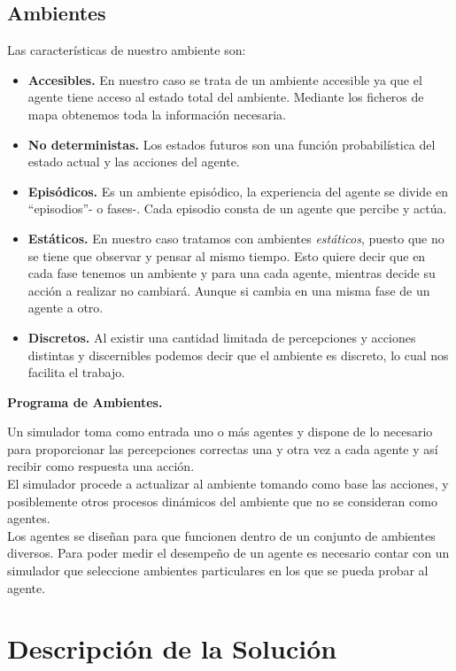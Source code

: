 \documentclass[a4paper,12pt,oneside]{book}
\begin{document}
\section{Ambientes}
Las características de nuestro ambiente son:
\begin{itemize}
\item {\bf Accesibles.} En nuestro caso se trata de un
  ambiente accesible ya que el agente tiene acceso al estado total
  del ambiente. Mediante los ficheros de mapa obtenemos toda la
  información necesaria.
\item {\bf No deterministas.}                                                 
Los estados futuros son una función probabilística del estado actual y
las acciones del agente.
\item {\bf Episódicos.} Es un ambiente episódico, la experiencia del
  agente se divide en ``episodios''- o fases-. Cada episodio consta de
  un agente que percibe y actúa.
\item {\bf Estáticos.}   En nuestro caso tratamos con ambientes {\it
    estáticos}, puesto que no se tiene que observar y pensar al mismo
  tiempo. Esto quiere decir que en cada fase tenemos un ambiente y
  para una cada agente, mientras decide su acción a realizar no
  cambiará. Aunque si cambia en una misma fase de un agente a otro.
\item {\bf Discretos.} Al existir una cantidad limitada de
  percepciones y acciones distintas y discernibles podemos decir que el
  ambiente es discreto, lo cual nos facilita el trabajo.
\end{itemize}

{\bf Programa de Ambientes.}

Un simulador toma como entrada uno o más agentes y dispone de lo
necesario para proporcionar las percepciones correctas una y otra vez
a cada agente y así recibir como respuesta una acción.\\

El simulador procede a actualizar  al ambiente tomando como base las
acciones, y posiblemente otros procesos dinámicos del ambiente que no
se consideran como agentes.\\

Los agentes se diseñan para que funcionen dentro de un conjunto de
ambientes diversos. Para poder medir el desempeño de un agente es
necesario contar con un simulador que seleccione ambientes
particulares en los que se pueda probar al agente.




\chapter{Descripción de la Solución}
\end{document}

